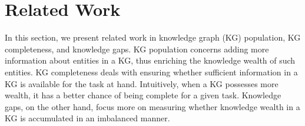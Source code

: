



\section{Related Work}

In this section, we present related work in knowledge graph (KG) population, KG completeness, and knowledge gaps. KG population concerns adding more information about entities in a KG, thus enriching the knowledge wealth of such entities. KG completeness deals with ensuring whether sufficient information in a KG is available for the task at hand. Intuitively, when a KG possesses more wealth, it has a better chance of being complete for a given task. Knowledge gaps, on the other hand, focus more on measuring whether knowledge wealth in a KG is accumulated in an imbalanced manner.

